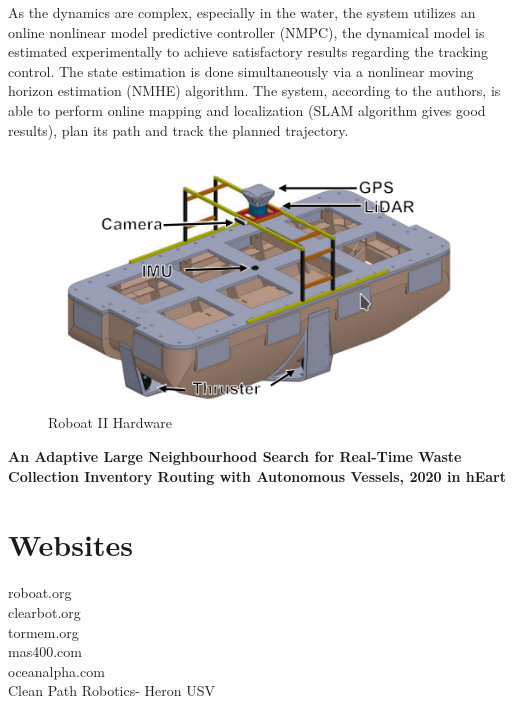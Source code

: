 \documentclass{article}
\begin{document}
As the dynamics are complex, especially in the water, the system utilizes an online nonlinear model predictive controller (NMPC), the dynamical model is estimated experimentally to achieve satisfactory results regarding the tracking control. 
The state estimation is done simultaneously via a nonlinear moving horizon estimation (NMHE) algorithm. 
The system, according to the authors, is able to perform online mapping and localization (SLAM algorithm gives good results), plan its path and track the planned trajectory. 

\begin{figure}[htbp]
	\centerline{\includegraphics[scale=.5]{roboatII-HW.png}}
	\caption{Roboat II Hardware}
	\label{fig}
\end{figure}



\textbf{An Adaptive Large Neighbourhood Search for Real-Time Waste Collection
	Inventory Routing with Autonomous Vessels, 2020 in hEart}


	

\section{Websites}

roboat.org \\
clearbot.org \\
tormem.org \\
mas400.com \\
oceanalpha.com \\
Clean Path Robotics- Heron USV
\end{document}
